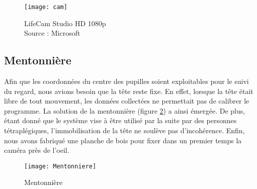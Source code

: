 \begin{figure}[H]
  \centering
  \texttt{[image: cam]}
  \caption{LifeCam Studio HD 1080p \\Source : Microsoft}
  \label{fig:Cam}
\end{figure}

\subsection{Mentonnière}

Afin que les coordonnées du centre des pupilles soient exploitables pour le suivi du regard, nous avions besoin que la tête reste fixe. En effet, lorsque la tête était libre de tout mouvement, les données collectées ne permettait pas de calibrer le programme. La solution de la mentonnière (figure \ref{fig:Menton}) a ainsi émergée. De plus, étant donné que le système vise à être utilisé par la suite par des personnes tétraplégiques, l'immobilisation de la tête ne soulève pas d'incohérence.
Enfin, nous avons fabriqué une planche de bois pour fixer dans un premier temps la caméra près de l'oeil. 

\begin{figure}[H]
  \centering
  \texttt{[image: Mentonniere]}
  \caption{Mentonnière}
  \label{fig:Menton}
\end{figure}